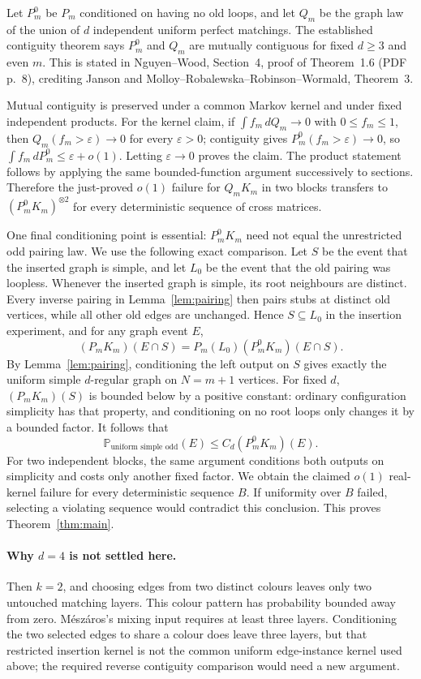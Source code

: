 \documentclass[11pt]{article}
\newcommand{\Prb}{\mathbb P}
\begin{document}
Let $P_m^0$ be $P_m$ conditioned on having no old loops, and let $Q_m$
be the graph law of the union of $d$ independent uniform perfect
matchings. The established contiguity theorem says $P_m^0$ and $Q_m$
are mutually contiguous for fixed $d\ge3$ and even $m$. This is stated
in Nguyen--Wood, Section~4, proof of Theorem~1.6 (PDF p.~8), crediting
Janson and Molloy--Robalewska--Robinson--Wormald, Theorem~3.

Mutual contiguity is preserved under a common Markov kernel and under
fixed independent products. For the kernel claim, if
$\int f_m\,dQ_m\to0$ with $0\le f_m\le1$, then
$Q_m(f_m>\varepsilon)\to0$ for every $\varepsilon>0$;
contiguity gives $P_m^0(f_m>\varepsilon)\to0$, so
$\int f_m\,dP_m^0\le\varepsilon+o(1)$. Letting $\varepsilon\to0$
proves the claim. The product statement follows by applying the same
bounded-function argument successively to sections.
Therefore the just-proved $o(1)$ failure for $Q_mK_m$ in two blocks
transfers to $(P_m^0K_m)^{\otimes2}$ for every deterministic sequence
of cross matrices.

One final conditioning point is essential: $P_m^0K_m$ need not equal
the unrestricted odd pairing law. We use the following exact comparison.
Let $S$ be the event that the inserted graph is simple, and let $L_0$
be the event that the old pairing was loopless. Whenever the inserted
graph is simple, its root neighbours are distinct. Every inverse pairing
in Lemma~\ref{lem:pairing} then pairs stubs at distinct old vertices,
while all other old edges are unchanged. Hence $S\subseteq L_0$ in
the insertion experiment, and for any graph event $E$,
\[
 (P_mK_m)(E\cap S)
 =P_m(L_0)(P_m^0K_m)(E\cap S).
\]
By Lemma~\ref{lem:pairing}, conditioning the left output on $S$ gives
exactly the uniform simple $d$-regular graph on $N=m+1$ vertices.
For fixed $d$, $(P_mK_m)(S)$ is bounded below by a positive constant:
ordinary configuration simplicity has that property, and conditioning
on no root loops only changes it by a bounded factor. It follows that
\[
 \Prb_{\text{uniform simple odd}}(E)
 \le C_d(P_m^0K_m)(E).
\]
For two independent blocks, the same argument conditions both outputs
on simplicity and costs only another fixed factor. We obtain the
claimed $o(1)$ real-kernel failure for every deterministic sequence $B$.
If uniformity over $B$ failed, selecting a violating sequence would
contradict this conclusion. This proves Theorem~\ref{thm:main}.

\paragraph{Why $d=4$ is not settled here.}
Then $k=2$, and choosing edges from two distinct colours leaves only
two untouched matching layers. This colour pattern has probability
bounded away from zero. M\'esz\'aros's mixing input requires at least
three layers. Conditioning the two selected edges to share a colour
does leave three layers, but that restricted insertion kernel is not
the common uniform edge-instance kernel used above; the required
reverse contiguity comparison would need a new argument.
\end{document}
